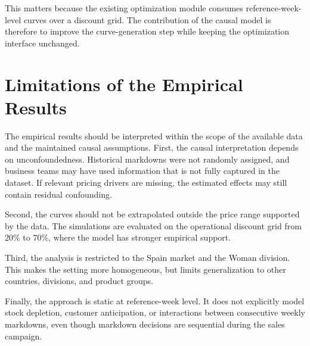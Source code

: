 This matters because the existing optimization module consumes reference-week-level curves over a discount grid. The contribution of the causal model is therefore to improve the curve-generation step while keeping the optimization interface unchanged.

\section{Limitations of the Empirical Results}
\label{sec:results-limitations}

The empirical results should be interpreted within the scope of the available data and the maintained causal assumptions. First, the causal interpretation depends on unconfoundedness. Historical markdowns were not randomly assigned, and business teams may have used information that is not fully captured in the dataset. If relevant pricing drivers are missing, the estimated effects may still contain residual confounding.

Second, the curves should not be extrapolated outside the price range supported by the data. The simulations are evaluated on the operational discount grid from 20\% to 70\%, where the model has stronger empirical support.

Third, the analysis is restricted to the Spain market and the Woman division. This makes the setting more homogeneous, but limits generalization to other countries, divisions, and product groups.

Finally, the approach is static at reference-week level. It does not explicitly model stock depletion, customer anticipation, or interactions between consecutive weekly markdowns, even though markdown decisions are sequential during the sales campaign.